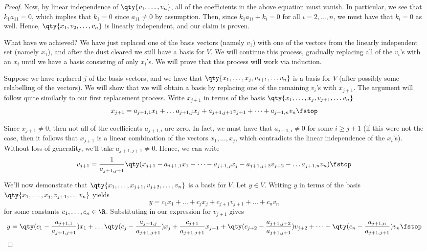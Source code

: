 \begin{proof}
  Now, by linear independence of \( \qty{v_1,\dots,v_n} \), all of the coefficients in the above equation must vanish. In particular, we see that \( k_1a_{11}=0 \), which implies that \( k_1=0 \) since \( a_{11}\neq 0 \) by assumption. Then, since \( k_1a_{1i}+k_i=0 \) for all \( i=2,\dots, n \), we must have that \( k_i=0 \) as well. Hence, \( \qty{x_1,v_2,\dots, v_n} \) is linearly independent, and our claim is proven.

  \vspace{3mm}

  What have we achieved? We have just replaced one of the basis vectors (namely \( v_1 \)) with one of the vectors from the linearly independent set (namely \( x_1 \)), and after the dust cleared we still have a basis for \( V \). We will continue this process, gradually replacing all of the \( v_i \)'s with an \( x_i \) until we have a basis consisting of only \( x_i \)'s. We will prove that this process will work via induction.

  \vspace{3mm}

  Suppose we have replaced \( j \) of the basis vectors, and we have that \( \qty{x_1,\dots, x_j, v_{j+1},\dots v_n} \) is a basis for \( V \) (after possibly some relabelling of the vectors). We will show that we will obtain a basis by replacing one of the remaining \( v_i \)'s with \( x_{j+1} \). The argument will follow quite similarly to our first replacement process. Write \( x_{j+1} \) in terms of the basis \( \qty{x_1,\dots, x_j, v_{j+1},\dots v_n} \)
  \[ x_{j+1}=a_{j+1,1}x_1+\dots a_{j+1,j}x_j+a_{j+1,j+1}v_{j+1}+\dots+a_{j+1,n}v_n\fstop \]
  
  Since \( x_{j+1}\neq 0 \), then not all of the coefficients \( a_{j+1,i} \) are zero. In fact, we must have that \( a_{j+1,i}\neq 0 \) for some \( i\geq j+1 \) (if this were not the case, then it follows that \( x_{j+1} \) is a linear combination of the vectors \( x_1,\dots, x_j \), which contradicts the linear independence of the \( x_i \)'s). Without loss of generality, we'll take \( a_{j+1,j+1}\neq 0 \). Hence, we can write
  \[ v_{j+1}=\frac{1}{a_{j+1,j+1}}\qty(x_{j+1}-a_{j+1,1}x_1-\dots -a_{j+1,j}x_j-a_{j+1,j+2}v_{j+2}-\dots a_{j+1,n}v_n)\fstop \]
  
  We'll now demonstrate that \( \qty{x_1,\dots,x_{j+1},v_{j+2},\dots,v_n} \) is a basis for \( V \). Let \( y\in V \). Writing \( y \) in terms of the basis \( \qty{x_1,\dots, x_j, v_{j+1},\dots v_n} \) yields
  \[ y=c_1x_1+\dots+c_jx_j+c_{j+1}v_{j+1}+\dots+c_nv_n \]
  for some constants \( c_1,\dots,c_n\in\R \). Substituting in our expression for \( v_{j+1} \) gives
  \[ y=\qty(c_1-\frac{a_{j+1,1}}{a_{j+1,j+1}})x_1+\dots\qty(c_j-\frac{a_{j+1,j}}{a_{j+1,j+1}})x_j+\frac{c_{j+1}}{a_{j+1,j+1}}x_{j+1}+\qty(c_{j+2}-\frac{a_{j+1,j+2}}{a_{j+1,j+1}})v_{j+2}+\dots+\qty(c_n-\frac{a_{j+1,n}}{a_{j+1,j+1}})v_n\fstop \]
  

\end{proof}
